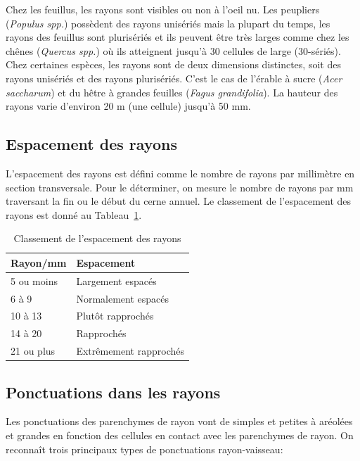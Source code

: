Chez les feuillus, les rayons sont visibles ou non à l'oeil nu. Les peupliers (\textit{Populus spp.}) possèdent des rayons unisériés mais la plupart du temps, les rayons des feuillus sont plurisériés et ils peuvent être très larges comme chez les chênes (\textit{Quercus spp.}) où ils atteignent jusqu'à 30 cellules de large (30-sériés). Chez certaines espèces, les rayons sont de deux dimensions distinctes, soit des rayons unisériés et des rayons plurisériés. C'est le cas de l'érable à sucre (\textit{Acer saccharum}) et du hêtre à grandes feuilles (\textit{Fagus grandifolia}). La hauteur des rayons varie d'environ 20 m (une cellule) jusqu'à 50 mm.

\subsection{Espacement des rayons}

L'espacement des rayons est défini comme le nombre de rayons par millimètre en section transversale. Pour le déterminer, on mesure le nombre de rayons par mm traversant la fin ou le début du cerne annuel. Le classement de l'espacement des rayons est donné au Tableau~\ref{tab:espace_rayons}.

\begin{table}[ht]
	\centering
	\begin{tabular}{l l}
		\hline
		\bf Rayon/mm & \bf Espacement\\
		\hline
		\hline
		5 ou moins & Largement espacés\\
		6 à 9 & Normalement espacés \\
		10 à 13 & Plutôt rapprochés \\
		14 à 20 & Rapprochés \\
		21 ou plus & Extrêmement rapprochés\\
		\hline	
	\end{tabular}
	\caption{Classement de l'espacement des rayons}
\label{tab:espace_rayons}
\end{table}

\subsection{Ponctuations dans les rayons}

Les ponctuations des parenchymes de rayon vont de simples et petites à aréolées et grandes en fonction des cellules en contact avec les parenchymes de rayon. On reconnaît trois principaux types de ponctuations rayon-vaisseau:

